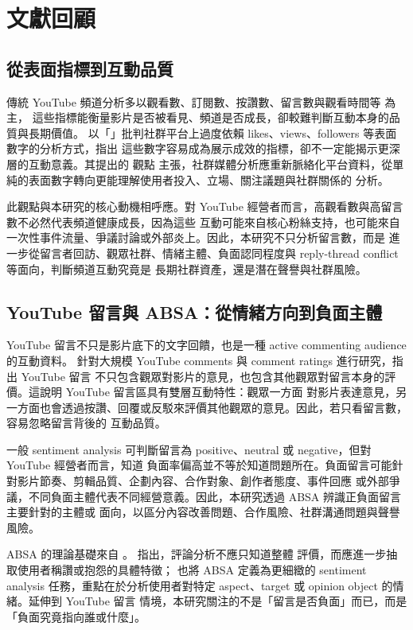 \section{文獻回顧}

\subsection{從表面指標到互動品質}

傳統 YouTube 頻道分析多以觀看數、訂閱數、按讚數、留言數與觀看時間等  為主，
這些指標能衡量影片是否被看見、頻道是否成長，卻較難判斷互動本身的品質與長期價值。\citet{rogers2018}
以「」批判社群平台上過度依賴 likes、views、followers 等表面數字的分析方式，指出
這些數字容易成為展示成效的指標，卻不一定能揭示更深層的互動意義。其提出的  觀點
主張，社群媒體分析應重新脈絡化平台資料，從單純的表面數字轉向更能理解使用者投入、立場、關注議題與社群關係的
分析。

此觀點與本研究的核心動機相呼應。對 YouTube 經營者而言，高觀看數與高留言數不必然代表頻道健康成長，因為這些
互動可能來自核心粉絲支持，也可能來自一次性事件流量、爭議討論或外部炎上。因此，本研究不只分析留言數，而是
進一步從留言者回訪、觀眾社群、情緒主體、負面認同程度與 reply-thread conflict 等面向，判斷頻道互動究竟是
長期社群資產，還是潛在聲譽與社群風險。

\subsection{YouTube 留言與 ABSA：從情緒方向到負面主體}

YouTube 留言不只是影片底下的文字回饋，也是一種 active commenting audience 的互動資料。
\citet{siersdorfer2010} 針對大規模 YouTube comments 與 comment ratings 進行研究，指出 YouTube 留言
不只包含觀眾對影片的意見，也包含其他觀眾對留言本身的評價。這說明 YouTube 留言區具有雙層互動特性：觀眾一方面
對影片表達意見，另一方面也會透過按讚、回覆或反駁來評價其他觀眾的意見。因此，若只看留言數，容易忽略留言背後的
互動品質。

一般 sentiment analysis 可判斷留言為 positive、neutral 或 negative，但對 YouTube 經營者而言，知道
負面率偏高並不等於知道問題所在。負面留言可能針對影片節奏、剪輯品質、企劃內容、合作對象、創作者態度、事件回應
或外部爭議，不同負面主體代表不同經營意義。因此，本研究透過 ABSA 辨識正負面留言主要針對的主體或
面向，以區分內容改善問題、合作風險、社群溝通問題與聲譽風險。

ABSA 的理論基礎來自 。\citet{hu2004} 指出，評論分析不應只知道整體
評價，而應進一步抽取使用者稱讚或抱怨的具體特徵；\citet{zhang2023} 也將 ABSA 定義為更細緻的 sentiment
analysis 任務，重點在於分析使用者對特定 aspect、target 或 opinion object 的情緒。延伸到 YouTube 留言
情境，本研究關注的不是「留言是否負面」而已，而是「負面究竟指向誰或什麼」。

